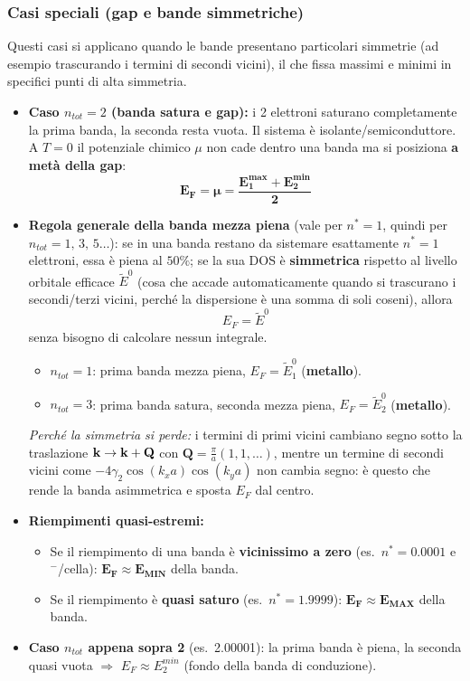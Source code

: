\subsubsection*{Casi speciali (gap e bande simmetriche)}
Questi casi si applicano quando le bande presentano particolari simmetrie (ad esempio trascurando i termini di secondi vicini), il che fissa massimi e minimi in specifici punti di alta simmetria.
\begin{itemize}
    \item \textbf{Caso $n_{tot}=2$ (banda satura e gap):} i 2 elettroni saturano completamente la prima banda, la seconda resta vuota. Il sistema è isolante/semiconduttore. A $T=0$ il potenziale chimico $\mu$ non cade dentro una banda ma si posiziona \textbf{a metà della gap}:
    \[ \bm{E_F = \mu = \frac{E_1^{max}+E_2^{min}}{2}} \]
    \item \textbf{Regola generale della banda mezza piena} (vale per $n^*=1$, quindi per $n_{tot}=1,\,3,\,5\dots$): se in una banda restano da sistemare esattamente $n^*=1$ elettroni, essa è piena al $50\%$; se la sua DOS è \textbf{simmetrica} rispetto al livello orbitale efficace $\tilde E^0$ (cosa che accade automaticamente quando si trascurano i secondi/terzi vicini, perché la dispersione è una somma di soli coseni), allora
    \[ \boxed{E_F = \tilde E^0} \]
    senza bisogno di calcolare nessun integrale.
    \begin{itemize}
      \item $n_{tot}=1$: prima banda mezza piena, $E_F=\tilde E_1^0$ (\textbf{metallo}).
      \item $n_{tot}=3$: prima banda satura, seconda mezza piena, $E_F=\tilde E_2^0$ (\textbf{metallo}).
    \end{itemize}
    \textit{Perché la simmetria si perde:} i termini di primi vicini cambiano segno sotto la traslazione $\mathbf{k}\to\mathbf{k}+\mathbf{Q}$ con $\mathbf{Q}=\frac{\pi}{a}(1,1,\dots)$, mentre un termine di secondi vicini come $-4\gamma_2\cos(k_xa)\cos(k_ya)$ non cambia segno: è questo che rende la banda asimmetrica e sposta $E_F$ dal centro.
    \item \textbf{Riempimenti quasi-estremi:}
    \begin{itemize}
        \item Se il riempimento di una banda è \textbf{vicinissimo a zero} (es.\ $n^*=0.0001$ e$^-$/cella): $\bm{E_F\approx E_{MIN}}$ della banda.
        \item Se il riempimento è \textbf{quasi saturo} (es.\ $n^*=1.9999$): $\bm{E_F\approx E_{MAX}}$ della banda.
    \end{itemize}
    \item \textbf{Caso $n_{tot}$ appena sopra 2} (es.\ 2.00001): la prima banda è piena, la seconda quasi vuota $\Rightarrow$ $E_F \approx E_2^{min}$ (fondo della banda di conduzione).
\end{itemize}

